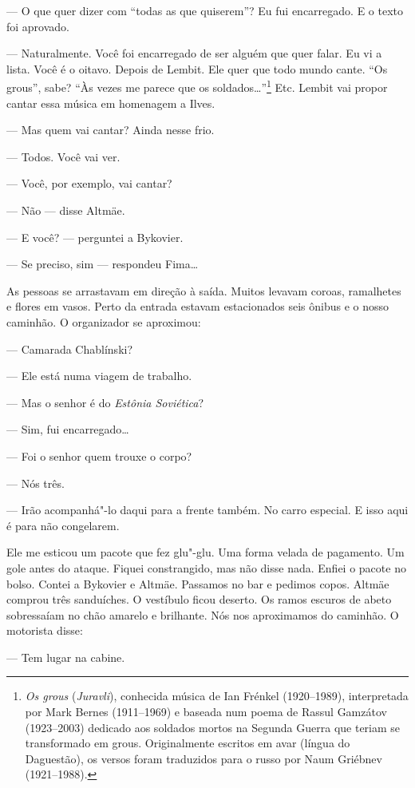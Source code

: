 --- O que quer dizer com ``todas as que quiserem''? Eu fui encarregado.
E o texto foi aprovado.

--- Naturalmente. Você foi encarregado de ser alguém que quer falar. Eu
vi a lista. Você é o oitavo. Depois de Lembit. Ele quer que todo mundo
cante. ``Os grous'', sabe? ``Às vezes me parece que os
soldados\ldots{}''\footnote{\emph{Os grous} (\emph{Juravli}),
  conhecida música de Ian Frénkel (1920--1989), interpretada por Mark
  Bernes (1911--1969) e baseada num poema de Rassul Gamzátov
  (1923--2003) dedicado aos soldados mortos na Segunda Guerra que teriam
  se transformado em grous. Originalmente escritos em avar (língua do
  Daguestão), os versos foram traduzidos para o russo por Naum Griébnev
  (1921--1988).} Etc. Lembit vai propor cantar essa música em homenagem
a Ilves.

--- Mas quem vai cantar? Ainda nesse frio.

--- Todos. Você vai ver.

--- Você, por exemplo, vai cantar?

--- Não --- disse Altmäe.

--- E você? --- perguntei a Bykovier.

--- Se preciso, sim --- respondeu Fima\ldots{}

As pessoas se arrastavam em direção à saída. Muitos levavam coroas,
ramalhetes e flores em vasos. Perto da entrada estavam estacionados seis
ônibus e o nosso caminhão. O organizador se aproximou:

--- Camarada Chablínski?

--- Ele está numa viagem de trabalho.

--- Mas o senhor é do \emph{Estônia Soviética}?

--- Sim, fui encarregado\ldots{}

--- Foi o senhor quem trouxe o corpo?

--- Nós três.

--- Irão acompanhá"-lo daqui para a frente também. No carro especial.
E isso aqui é para não congelarem.

Ele me esticou um pacote que fez glu"-glu. Uma forma velada de pagamento.
Um gole antes do ataque. Fiquei constrangido, mas não disse nada. Enfiei
o pacote no bolso. Contei a Bykovier e Altmäe. Passamos no bar e pedimos
copos. Altmäe comprou três sanduíches. O vestíbulo ficou deserto. Os
ramos escuros de abeto sobressaíam no chão amarelo e brilhante. Nós
nos aproximamos do caminhão. O motorista disse:

--- Tem lugar na cabine.

